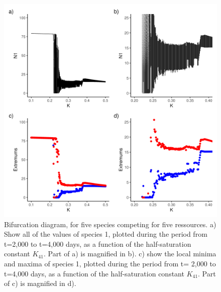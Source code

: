 \begin{figure}[H]
\begin{center} 
 \includegraphics[width=1\textwidth]{../Code/Figures/Figure_3.png}
  \caption{Bifurcation diagram, for five species competing for five ressources. 
a) Show all of the values of species 1, plotted during the period from t=2,000 
to t=4,000 days, as a function of the half-saturation constant $K_{41}$. Part of a) 
is magnified in b). c) show the local minima and maxima of species 1, plotted 
during the period from t= 2,000 to t=4,000 days, as a function of the 
half-saturation constant $K_{41}$. Part of c) is magnified in d).}
  \label{figures:Fig3}
\end{center}
\end{figure}


